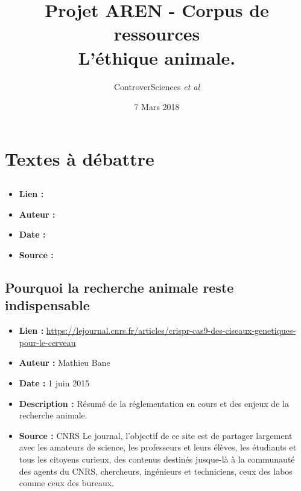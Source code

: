 \documentclass[8pt]{article}
\author{ControverSciences\textit{ et al} }
\title{Projet AREN - Corpus de ressources \\ L’éthique animale.}
\date{7 Mars 2018}
\begin{document}
\maketitle

\tableofcontents

\newpage
\section{Textes à débattre}
\subsection{}
\begin{itemize}
	\item \textbf{Lien : }  \url{} 
	\item \textbf{Auteur : } 
	\item \textbf{Date : }  
	\item \textbf{Source : }  
\end{itemize}


\newpage
\subsection{Pourquoi la recherche animale reste indispensable}

\begin{itemize}
	\item \textbf{Lien : }  \url{https://lejournal.cnrs.fr/articles/crispr-cas9-des-ciseaux-genetiques-pour-le-cerveau} 
	\item \textbf{Auteur : } Mathieu Bane
	\item \textbf{Date : } 1 juin 2015
	\item \textbf{Description : } Résumé de la réglementation en cours et des enjeux de la recherche animale. 
	\item \textbf{Source : } CNRS Le journal, l'objectif de ce site est de partager largement avec les amateurs de science, les professeurs et leurs élèves, les étudiants et tous les citoyens curieux, des contenus destinés jusque-là à la communauté des agents du CNRS, chercheurs, ingénieurs et techniciens, ceux des labos comme ceux des bureaux.
\end{itemize}
\end{document}
